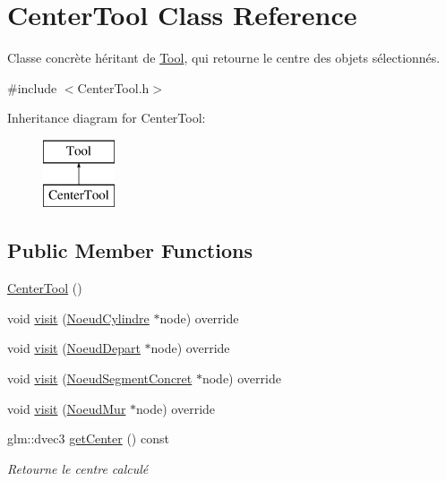 \hypertarget{class_center_tool}{}\section{Center\+Tool Class Reference}
\label{class_center_tool}


Classe concrète héritant de \hyperlink{class_tool}{Tool}, qui retourne le centre des objets sélectionnés.  




{\ttfamily \#include $<$Center\+Tool.\+h$>$}

Inheritance diagram for Center\+Tool\+:\begin{figure}[H]
\begin{center}
\leavevmode
\includegraphics[height=2.000000cm]{class_center_tool}
\end{center}
\end{figure}
\subsection*{Public Member Functions}
\begin{DoxyCompactItemize}
\item 
\hyperlink{group__inf2990_ga3814d534b50e7dff7fbd7efef552685d}{Center\+Tool} ()
\item 
void \hyperlink{group__inf2990_ga9ceff880a444e12bc6b4dab4313c1809}{visit} (\hyperlink{class_noeud_cylindre}{Noeud\+Cylindre} $\ast$node) override
\item 
void \hyperlink{group__inf2990_ga8417547d629ccacfa218979e6ba6cdf5}{visit} (\hyperlink{class_noeud_depart}{Noeud\+Depart} $\ast$node) override
\item 
void \hyperlink{group__inf2990_gac441b1692c3b057050ced592ba372263}{visit} (\hyperlink{class_noeud_segment_concret}{Noeud\+Segment\+Concret} $\ast$node) override
\item 
void \hyperlink{group__inf2990_ga13d2bac067f4262be4fd60c302a07124}{visit} (\hyperlink{class_noeud_mur}{Noeud\+Mur} $\ast$node) override
\item 
glm\+::dvec3 \hyperlink{group__inf2990_gaf086e5f530c5189f4b72563a4abfe35f}{get\+Center} () const 
\begin{DoxyCompactList}\small\item\em Retourne le centre calculé \end{DoxyCompactList}\end{DoxyCompactItemize}
